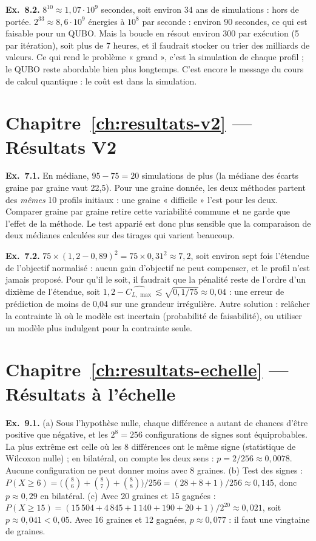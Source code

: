 \textbf{Ex.~8.2.} $8^{10}\approx1{,}07\cdot10^9$ secondes, soit environ 34 ans de simulations : hors de portée. $2^{33}\approx8{,}6\cdot10^9$ énergies à $10^8$ par seconde : environ 90 secondes, ce qui est faisable pour un QUBO. Mais la boucle en résout environ 300 par exécution (5 par itération), soit plus de 7 heures, et il faudrait stocker ou trier des milliards de valeurs. Ce qui rend le problème « grand », c'est la simulation de chaque profil ; le QUBO reste abordable bien plus longtemps. C'est encore le message du cours de calcul quantique : le coût est dans la simulation.

\section*{Chapitre~\ref{ch:resultats-v2} — Résultats V2}
\textbf{Ex.~7.1.} En médiane, $95-75=20$ simulations de plus (la médiane des écarts graine par graine vaut 22,5). Pour une graine donnée, les deux méthodes partent des \emph{mêmes} 10 profils initiaux : une graine « difficile » l'est pour les deux. Comparer graine par graine retire cette variabilité commune et ne garde que l'effet de la méthode. Le test apparié est donc plus sensible que la comparaison de deux médianes calculées sur des tirages qui varient beaucoup.

\textbf{Ex.~7.2.} $75\times(1{,}2-0{,}89)^2=75\times0{,}31^2\approx7{,}2$, soit environ sept fois l'étendue de l'objectif normalisé : aucun gain d'objectif ne peut compenser, et le profil n'est jamais proposé. Pour qu'il le soit, il faudrait que la pénalité reste de l'ordre d'un dixième de l'étendue, soit $1{,}2-\widehat{C_{L,\max}}\lesssim\sqrt{0{,}1/75}\approx0{,}04$ : une erreur de prédiction de moins de 0,04 sur une grandeur irrégulière. Autre solution : relâcher la contrainte là où le modèle est incertain (probabilité de faisabilité), ou utiliser un modèle plus indulgent pour la contrainte seule.

\section*{Chapitre~\ref{ch:resultats-echelle} — Résultats à l'échelle}
\textbf{Ex.~9.1.} (a) Sous l'hypothèse nulle, chaque différence a autant de chances d'être positive que négative, et les $2^8=256$ configurations de signes sont équiprobables. La plus extrême est celle où les 8 différences ont le même signe (statistique de Wilcoxon nulle) ; en bilatéral, on compte les deux sens : $p=2/256\approx0{,}0078$. Aucune configuration ne peut donner moins avec 8 graines. (b) Test des signes : $P(X\ge6)=\big(\binom86+\binom87+\binom88\big)/256=(28+8+1)/256\approx0{,}145$, donc $p\approx0{,}29$ en bilatéral. (c) Avec 20 graines et 15 gagnées : $P(X\ge15)=(15\,504+4\,845+1\,140+190+20+1)/2^{20}\approx0{,}021$, soit $p\approx0{,}041<0{,}05$. Avec 16 graines et 12 gagnées, $p\approx0{,}077$ : il faut une vingtaine de graines.


